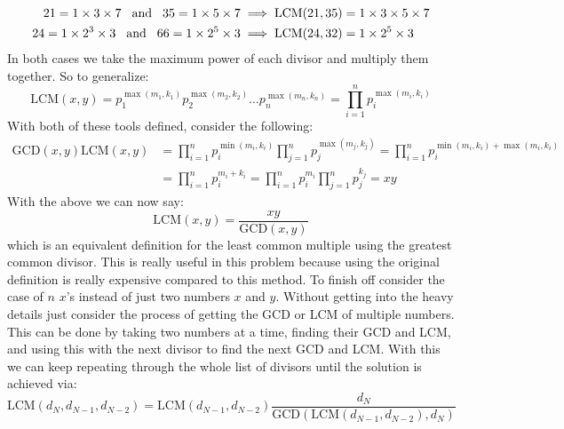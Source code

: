 \documentclass[12pt, letterpaper, onecolumn, conference, final]{IEEEtran}
\theoremstyle{definition}
\theoremstyle{plain}
\begin{document}
\begin{equation*}
\begin{split}
21 = 1 \times 3 \times 7 \hspace{.3cm} \text{and} \hspace{.3cm} 35 = 1 \times 5 \times 7 &\implies \text{LCM}(21, 35) = 1 \times 3 \times 5 \times 7 \\
24 = 1 \times 2^3 \times 3 \hspace{.3cm} \text{and} \hspace{.3cm} 66 = 1 \times 2^5 \times 3 &\implies \text{LCM}(24, 32) = 1 \times 2^5 \times 3
\end{split}
\end{equation*}
In both cases we take the maximum power of each divisor and multiply them together. So to generalize:
\begin{equation*}
\text{LCM}(x,y) = p_1^{\max(m_1,k_1)} p_2^{\max(m_2,k_2)} \dots p_n^{\max(m_n,k_n)} = \prod_{i=1}^n p_i^{\max(m_i,k_i)}
\end{equation*}
With both of these tools defined, consider the following:
\begin{equation*}
\begin{split}
\text{GCD}(x,y) \text{LCM}(x,y) &= \prod_{i=1}^n p_i^{\min(m_i,k_i)} \prod_{j=1}^n p_j^{\max(m_j,k_j)} = \prod_{i=1}^n p_i^{\min(m_i,k_i)+\max(m_i,k_i)} \\
&= \prod_{i=1}^n p_i^{m_i + k_i} = \prod_{i=1}^n p_i^{m_i} \prod_{j=1}^n p_j^{k_j} = xy
\end{split}
\end{equation*}
With the above we can now say:
\begin{equation*}
\text{LCM}(x,y) = \frac{xy}{\text{GCD}(x,y)}
\end{equation*}
which is an equivalent definition for the least common multiple using the greatest common divisor. This is really useful in this problem because using the original definition is really expensive compared to this method. To finish off consider the case of $n$ $x$'s instead of just two numbers $x$ and $y$. Without getting into the heavy details just consider the process of getting the GCD or LCM of multiple numbers. This can be done by taking two numbers at a time, finding their GCD and LCM, and using this with the next divisor to find the next GCD and LCM. With this we can keep repeating through the whole list of divisors until the solution is achieved via:
\begin{equation*}
\text{LCM}(d_N,d_{N-1},d_{N-2}) = \text{LCM}(d_{N-1},d_{N-2}) \frac{d_N}{\text{GCD}(\text{LCM}(d_{N-1},d_{N-2}),d_N)}
\end{equation*}

\end{document}
